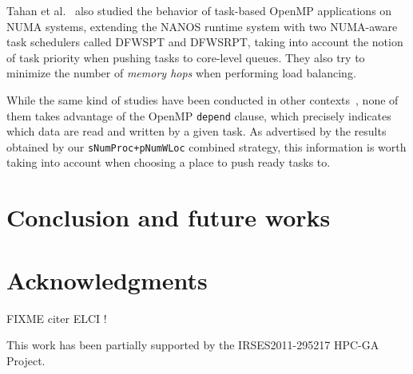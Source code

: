 \documentclass{Styles/llncs}
\begin{document}
Tahan et al.~\cite{DBLP:journals/corr/Tahan14} also studied the behavior of task-based OpenMP applications on NUMA systems, extending the NANOS runtime system with two NUMA-aware task schedulers called DFWSPT and DFWSRPT, taking into account the notion of task priority when pushing tasks to core-level queues. They also try to minimize the number of \emph{memory hops} when performing load balancing.

While the same kind of studies have been conducted in other contexts~\cite{DBLP:conf/europar/TerbovenSCM12,DBLP:journals/corr/abs-1101-0093}, none of them takes advantage of the OpenMP \verb/depend/ clause, which precisely indicates which data are read and written by a given task. As advertised by the results obtained by our \verb!sNumProc+pNumWLoc! combined strategy, this information is worth taking into account when choosing a place to push ready tasks to.




\section{Conclusion and future works}

\section*{Acknowledgments}

FIXME citer ELCI !

This work has been partially supported by the IRSES2011-295217
HPC-GA Project.

  \small 
  
\end{document}
